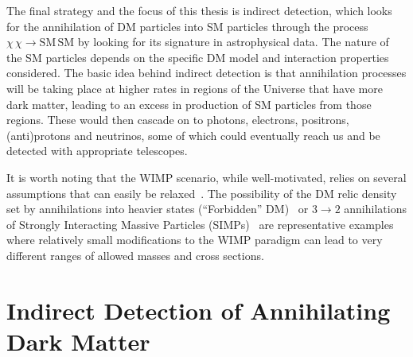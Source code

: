 The final strategy and the focus of this thesis is indirect detection, which looks for the annihilation of DM particles into SM particles through the process $\chi\,\chi\rightarrow\mathrm{SM}\,\mathrm{SM}$ by looking for its signature in astrophysical data. The nature of the SM particles depends on the specific DM model and interaction properties considered. The basic idea behind indirect detection is that annihilation processes will be taking place at higher rates in regions of the Universe that have more dark matter, leading to an excess in production of SM particles from those regions. These would then cascade on to photons, electrons, positrons, (anti)protons and neutrinos, some of which could eventually reach us and be detected with appropriate telescopes. %

It is worth noting that the WIMP scenario, while well-motivated, relies on several assumptions that can easily be relaxed~\cite{PhysRevD.43.3191}. The possibility of the DM relic density set by annihilations into heavier states (``Forbidden'' DM)~\cite{DAgnolo:2015ujb,PhysRevD.43.3191} or $3\rightarrow2$ annihilations of Strongly Interacting Massive Particles (SIMPs)~\cite{Hochberg:2014dra,Hochberg:2014kqa} are representative examples where relatively small modifications to the WIMP paradigm can lead to very different ranges of allowed masses and cross sections.

\section{Indirect Detection of Annihilating Dark Matter}
\label{sec:astrodm}

